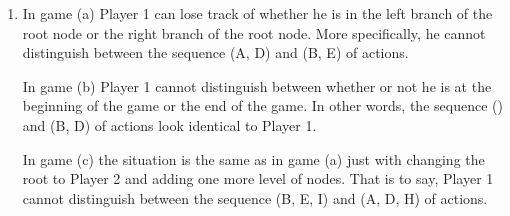 \documentclass[a4paper]{article}
\begin{document}
\begin{exercise}{3}
  \begin{enumerate}[label=(\alph*)]
    \item In game (a) Player 1 can lose track of whether he is in the left branch of the root node or the right branch of the root node. More specifically, he cannot distinguish between the sequence (A, D) and (B, E) of actions.

      In game (b) Player 1 cannot distinguish between whether or not he is at the beginning of the game or the end of the game. In other words, the sequence () and (B, D) of actions look identical to Player 1.

      In game (c) the situation is the same as in game (a) just with changing the root to Player 2 and adding one more level of nodes. That is to say, Player 1 cannot distinguish between the sequence (B, E, I) and (A, D, H) of actions.


\end{enumerate}
\end{exercise}
\end{document}
